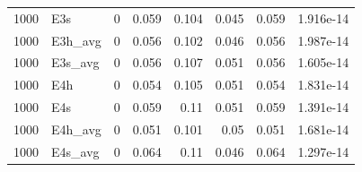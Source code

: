 \begin{table}[!htbp]
{\begin{tabular}{rlrrrrrr}
1000 & E3s & 0 & 0.059 & 0.104 & 0.045 & 0.059 & 1.916e-14 \\
1000 & E3h_avg & 0 & 0.056 & 0.102 & 0.046 & 0.056 & 1.987e-14 \\
1000 & E3s_avg & 0 & 0.056 & 0.107 & 0.051 & 0.056 & 1.605e-14 \\
1000 & E4h & 0 & 0.054 & 0.105 & 0.051 & 0.054 & 1.831e-14 \\
1000 & E4s & 0 & 0.059 & 0.11 & 0.051 & 0.059 & 1.391e-14 \\
1000 & E4h_avg & 0 & 0.051 & 0.101 & 0.05 & 0.051 & 1.681e-14 \\
1000 & E4s_avg & 0 & 0.064 & 0.11 & 0.046 & 0.064 & 1.297e-14 \\
\bottomrule
\end{tabular}
}
\end{table}
